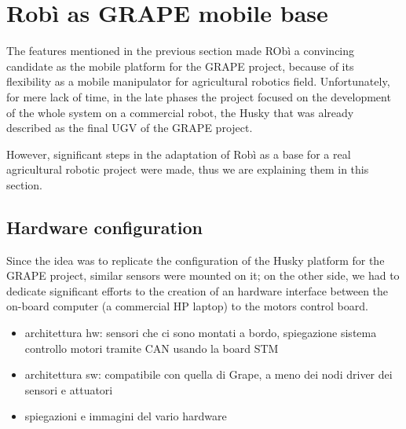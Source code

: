 \section{Robì as GRAPE mobile base}
The features mentioned in the previous section made RObì a convincing candidate as the mobile platform for the \ac{GRAPE} project, because of its flexibility as a mobile manipulator for agricultural robotics field. Unfortunately, for mere lack of time, in the late phases the project focused on the development of the whole system on a commercial robot, the Husky that was already described as the final \ac{UGV} of the \ac{GRAPE} project.
\par However, significant steps in the adaptation of Robì as a base for a real agricultural robotic project were made, thus we are explaining them in this section.

\subsection{Hardware configuration}
Since the idea was to replicate the configuration of the Husky platform for the \ac{GRAPE} project, similar sensors were mounted on it; on the other side, we had to dedicate significant efforts to the creation of an hardware interface between the on-board computer (a commercial HP laptop) to the motors control board.

\begin{itemize}
	\item architettura hw: sensori che ci sono montati a bordo, spiegazione sistema controllo motori tramite CAN usando la board STM
	\item architettura sw: compatibile con quella di Grape, a meno dei nodi driver dei sensori e attuatori
	\item spiegazioni e immagini del vario hardware
\end{itemize}
